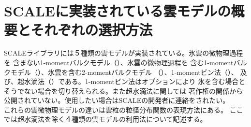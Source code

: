 \chapter{SCALEに実装されている雲モデルの概要とそれぞれの選択方法}

SCALEライブラリには５種類の雲モデルが実装されている。氷雲の微物理過程を
含まない1-momentバルクモデル（\cite{kessler_1969}）、氷雲の微物理過程を
含む1-momentバルクモデル（\cite{tomita_2008}）、氷雲を含む2-momentバルクモデル
（\cite{sn_2014}）、1-momentビン法（\cite{suzuki_etal_2010}）、
及び、超水滴法（\cite{Shima_etal_2009}）である。1-momentビン法はオプションにより
氷を含む場合とそうでない場合を切り替えられる。また超水滴法に関しては
著作権の関係から公開されていない。使用したい場合はSCALEの開発者に連絡をされたい。\\
これらの雲微物理モデルの違いは雲粒の粒径分布関数の表現方法にある。
ここでは超水滴法を除く４種類の雲モデルの利用法について記述する。

